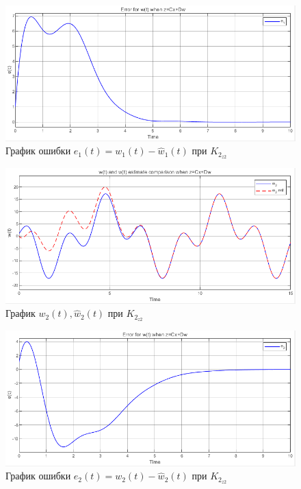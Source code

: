 \documentclass[a4paper, 12pt]{article}
\begin{document}
    \begin{figure}[H]
        \centering
        \includegraphics[scale=0.75]{3task_we1cd.png}
        \captionsetup{skip=0pt}
        \caption{График ошибки $e_1(t)=w_1(t)-\hat{w}_1(t)$ при $K_{2_{z2}}$}
        \label{fig:3task_we1cd}
    \end{figure}
    \begin{figure}[H]
        \centering
        \includegraphics[scale=0.75]{3task_wwh2cd.png}
        \captionsetup{skip=0pt}
        \caption{График $w_2(t),\hat{w}_2(t)$ при $K_{2_{z2}}$}
        \label{fig:3task_wwh2cd}
    \end{figure}
    \begin{figure}[H]
        \centering
        \includegraphics[scale=0.75]{3task_we2cd.png}
        \captionsetup{skip=0pt}
        \caption{График ошибки $e_2(t)=w_2(t)-\hat{w}_2(t)$ при $K_{2_{z2}}$}
        \label{fig:3task_we2cd}
    \end{figure}
\end{document}
